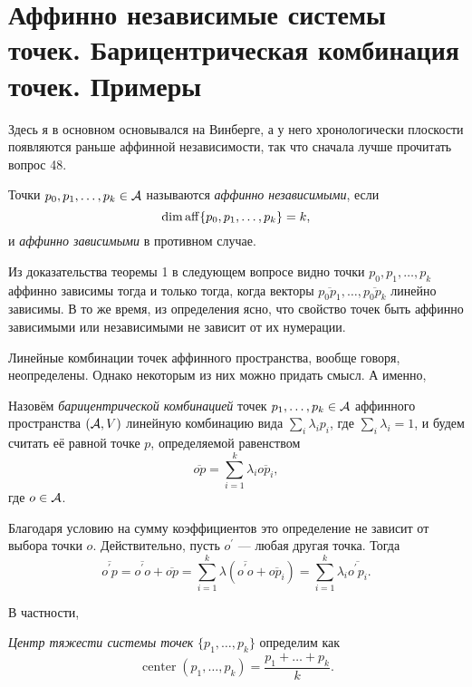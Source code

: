 \section{Аффинно независимые системы точек. Барицентрическая комбинация точек. Примеры}

Здесь я в основном основывался на Винберге, а у него хронологически плоскости появляются раньше аффинной независимости, так что сначала лучше прочитать вопрос 48.

\begin{definition}
    Точки $p_0, p_1, \ldots, p_k \in \mathcal{A}$ называются \textit{аффинно независимыми}, если \[\dim\operatorname{aff}\{p_0, p_1, \ldots, p_k\} = k,\] и \textit{аффинно зависимыми} в противном случае.
\end{definition}

Из доказательства теоремы 1 в следующем вопросе видно точки $p_0, p_1, \ldots, p_k$ аффинно зависимы тогда и только тогда, когда векторы $\overline{p_0p_1}, \ldots, \overline{p_0p_k}$ линейно зависимы. В то же время, из определения ясно, что свойство точек быть аффинно зависимыми или независимыми не зависит от их нумерации.

Линейные комбинации точек аффинного пространства, вообще говоря, неопределены. Однако некоторым из них можно придать смысл. А именно,

\begin{definition}
    Назовём \textit{барицентрической комбинацией} точек $p_1, \ldots, p_k \in \mathcal{A}$ аффинного пространства $(\mathcal{A}, V)$ линейную комбинацию вида $\sum\limits_i\lambda_ip_i$, где $\sum\limits_i\lambda_i = 1$, и будем считать её равной точке $p$, определяемой равенством
    \[
        \overline{op} = \sum_{i = 1}^k\lambda_i\overline{op_i},
    \]
    где $o \in \mathcal{A}$.
\end{definition}

Благодаря условию на сумму коэффициентов это определение не зависит от выбора точки $o$. Действительно, пусть $o^\prime$ --- любая другая точка. Тогда
\[
    \overline{o^\prime p} = \overline{o^\prime o} + \overline{op} = \sum_{i = 1}^k\lambda(\overline{o^\prime o} + \overline{op_i}) = \sum_{i = 1}^k\lambda_i\overline{o^\prime p_i}.
\]

В частности,

\begin{definition}
    \textit{Центр тяжести системы точек} $\{p_1, \ldots, p_k\}$ определим как
    \[
        \operatorname{center}(p_1, \ldots, p_k) = \frac{p_1 + \ldots + p_k}{k}.
    \]
\end{definition}

